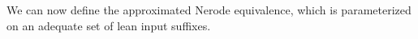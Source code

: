 




We can now define the approximated Nerode equivalence, which is parameterized
on an adequate set of lean input suffixes.

